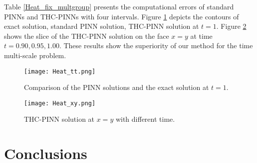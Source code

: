\documentclass[preprint]{elsarticle}
\numberwithin{table}{section}
\numberwithin{equation}{section}
\numberwithin{figure}{section}
\begin{document}
\begin{CJK}{UTF8}{gbsn}
Table \ref{Heat_fix_multgroup} presents  the computational errors of standard PINNs and   THC-PINNs with four intervals. Figure \ref{Heat_tt} depicts  the   contours of exact solution,    standard PINN solution,  THC-PINN solution   at $t=1$.  
Figure \ref{Heat_xx} shows the slice of 
the THC-PINN solution on the face $x=y$ at  time  $t = 0.90, 0.95, 1.00$.
  These results show the superiority of our method for the time multi-scale problem.


\begin{figure}[htbp]
\centering
\texttt{[image: Heat\_tt.png]}
\caption{Comparison of the PINN solutions   and the exact solution  at $t=1$.}
\label{Heat_tt}
\end{figure}


\begin{figure}[htbp]
\centering
\texttt{[image: Heat\_xy.png]}
\caption{THC-PINN solution  at  $x=y$ with different time.}
\label{Heat_xx}
\end{figure}


















\section{Conclusions}\label{sec5}

 


\end{CJK}
\end{document}
